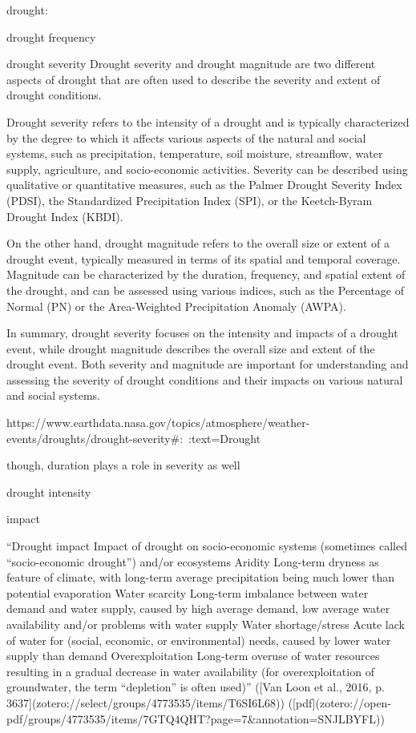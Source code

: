 {drought:



drought frequency


drought severity
Drought severity and drought magnitude are two different aspects of drought that are often used to describe the severity and extent of drought conditions.

Drought severity refers to the intensity of a drought and is typically characterized by the degree to which it affects various aspects of the natural and social systems, such as precipitation, temperature, soil moisture, streamflow, water supply, agriculture, and socio-economic activities. Severity can be described using qualitative or quantitative measures, such as the Palmer Drought Severity Index (PDSI), the Standardized Precipitation Index (SPI), or the Keetch-Byram Drought Index (KBDI).

On the other hand, drought magnitude refers to the overall size or extent of a drought event, typically measured in terms of its spatial and temporal coverage. Magnitude can be characterized by the duration, frequency, and spatial extent of the drought, and can be assessed using various indices, such as the Percentage of Normal (PN) or the Area-Weighted Precipitation Anomaly (AWPA).

In summary, drought severity focuses on the intensity and impacts of a drought event, while drought magnitude describes the overall size and extent of the drought event. Both severity and magnitude are important for understanding and assessing the severity of drought conditions and their impacts on various natural and social systems.

https://www.earthdata.nasa.gov/topics/atmosphere/weather-events/droughts/drought-severity#:~:text=Drought%

though, duration plays a role in severity as well


drought intensity


impact

“Drought impact Impact of drought on socio-economic systems (sometimes called “socio-economic drought”) and/or ecosystems Aridity Long-term dryness as feature of climate, with long-term average precipitation being much lower than potential evaporation Water scarcity Long-term imbalance between water demand and water supply, caused by high average demand, low average water availability and/or problems with water supply Water shortage/stress Acute lack of water for (social, economic, or environmental) needs, caused by lower water supply than demand Overexploitation Long-term overuse of water resources resulting in a gradual decrease in water availability (for overexploitation of groundwater, the term “depletion” is often used)” ([Van Loon et al., 2016, p. 3637](zotero://select/groups/4773535/items/T6SI6L68)) ([pdf](zotero://open-pdf/groups/4773535/items/7GTQ4QHT?page=7&annotation=SNJLBYFL))




}

